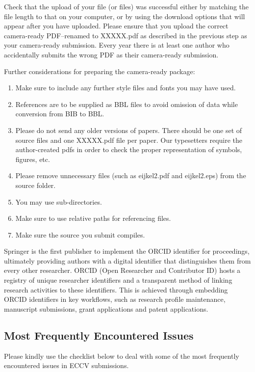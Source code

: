 \documentclass[runningheads]{llncs}
\begin{document}
Check that the upload of your file (or files) was successful either by matching the file length to that on your computer, or by using the download options that will appear after you have uploaded. 
Please ensure that you upload the correct camera-ready PDF–renamed to XXXXX.pdf as described in the previous step as your camera-ready submission. 
Every year there is at least one author who accidentally submits the wrong PDF as their camera-ready submission.

Further considerations for preparing the camera-ready package:
  \begin{enumerate}
    \item Make sure to include any further style files and fonts you may have used.
    \item References are to be supplied as BBL files to avoid omission of data while conversion from BIB to BBL.
    \item Please do not send any older versions of papers. 
          There should be one set of source files and one XXXXX.pdf file per paper. 
          Our typesetters require the author-created pdfs in order to check the proper representation of symbols, figures, etc.
    \item Please remove unnecessary files (such as eijkel2.pdf and eijkel2.eps) from the source folder. 
    \item You may use sub-directories.
    \item Make sure to use relative paths for referencing files.
    \item Make sure the source you submit compiles.
\end{enumerate}

Springer is the first publisher to implement the ORCID identifier for proceedings, ultimately providing authors with a digital identifier that distinguishes them from every other researcher. 
ORCID (Open Researcher and Contributor ID) hosts a registry of unique researcher identifiers and a transparent method of linking research activities to these identifiers. 
This is achieved through embedding ORCID identifiers in key workflows, such as research profile maintenance, manuscript submissions, grant applications and patent applications.

\subsection{Most Frequently Encountered Issues}
Please kindly use the checklist below to deal with some of the most frequently encountered issues in ECCV submissions.
\end{document}

